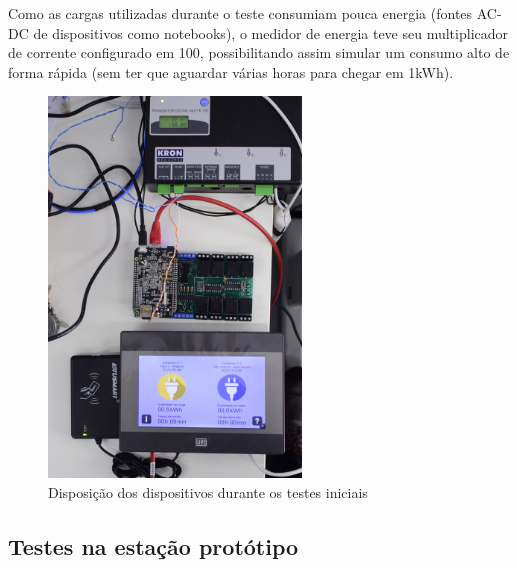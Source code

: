 Como as cargas utilizadas durante o teste consumiam pouca energia (fontes AC-DC de dispositivos como notebooks), o medidor de energia teve seu multiplicador de corrente configurado em 100, possibilitando assim simular um consumo alto de forma rápida (sem ter que aguardar várias horas para chegar em 1kWh).

\begin{figure}[H]
        \begin{center}
                \includegraphics[width=0.6\textwidth,natwidth=2130,natheight=1420,angle=-90]{assets/images/prototype-setup.jpg}
                \caption{Disposição dos dispositivos durante os testes iniciais}
                \label{fig:prototype-setup}
        \end{center}
\end{figure}

\subsection{Testes na estação protótipo}

